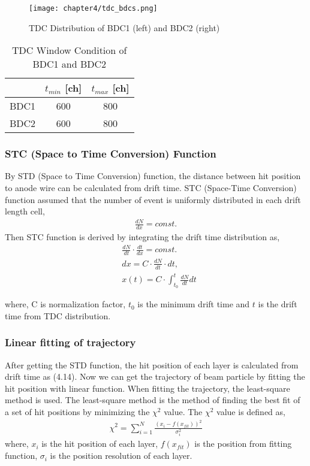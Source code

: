 \begin{figure}
    \centering
    \texttt{[image: chapter4/tdc\_bdcs.png]}
    \caption[TDC Distribution of BDCs]{TDC Distribution of BDC1 (left) and BDC2 (right)}
    \label{fig:TDC_BDCs}
\end{figure}

\begin{table}[h]
    \centering
    \begin{tabular}{c|cc}
        \hline
        &$t_{min}$ [ch]&$t_{max}$ [ch]\\
        \hline
        BDC1&600&800\\
        BDC2&600&800\\        
        \hline
    \end{tabular}
    \caption[TDC Window Condition of BDCs]{TDC Window Condition of BDC1 and BDC2}
    \label{tab:TDC_BDCs}
\end{table}

\subsubsection{STC (Space to Time Conversion) Function}
By STD (Space to Time Conversion) function, the distance between hit position to anode wire can be calculated from drift time. STC (Space-Time Conversion) function assumed that the number of event is uniformly distributed in each drift length cell,  
\begin{align}
    \frac{dN}{dx} = const.  
\end{align}
Then STC function is derived by integrating the drift time distribution as,
\begin{align}
    &\frac{dN}{dt} \cdot \frac{dt}{dx} = const.\\
    &dx = C \cdot \frac{dN}{dt} \cdot dt,\\
    &x(t) = C \cdot \int_{t_{0}}^{t} \frac{dN}{dt} dt
\end{align}

where, C is normalization factor, $t_0$ is the minimum drift time and $t$ is the drift time from TDC distribution. 

\subsubsection{Linear fitting of trajectory}
After getting the STD function, the hit position of each layer is calculated from drift time as (4.14). Now we can get the trajectory of beam particle by fitting the hit position with linear function. When fitting the trajectory, the least-square method is used. The least-square method is the method of finding the best fit of a set of hit positions by minimizing the $\chi^2$ value. The $\chi^2$ value is defined as,
\begin{align}
    \chi^2 = \sum_{i=1}^{N} \frac{(x_{i} - f(x_{fit}))^2}{\sigma_{i}^2}
\end{align}
where, $x_{i}$ is the hit position of each layer, $f(x_{fit})$ is the position from fitting function, $\sigma_{i}$ is the position resolution of each layer.

